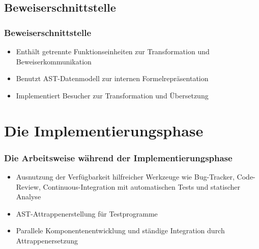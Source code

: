 \documentclass[t]{beamer}
\begin{document}
\subsection{Beweiserschnittstelle}

\begin{frame}
\frametitle{Beweiserschnittstelle}

\begin{itemize}
    \item<+-> Enthält getrennte Funktionseinheiten zur Transformation und Beweiserkommunikation
    \item<+-> Benutzt AST-Datenmodell zur internen Formelrepräsentation
    \item<+-> Implementiert Besucher zur Transformation und Übersetzung
\end{itemize}
\end{frame}

\section{Die Implementierungsphase}

\begin{frame}
\frametitle{Die Arbeitsweise während der Implementierungsphase}

\begin{itemize}
    \item<+-> Ausnutzung der Verfügbarkeit hilfreicher Werkzeuge wie Bug-Tracker, Code-Review, Continuous-Integration mit automatischen Tests und statischer Analyse
    \item<+-> AST-Attrappenerstellung für Testprogramme
    \item<+-> Parallele Komponentenentwicklung und ständige Integration durch Attrappenersetzung
\end{itemize}
\end{frame}
\end{document}
